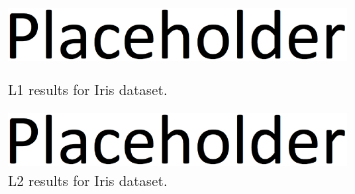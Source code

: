 \documentclass{article}
\begin{document}
\begin{figure}[h!]
  \centering
  \begin{minipage}{0.48\textwidth}
  \centering
  \includegraphics[width=0.8\textwidth]{placeholder.eps}
  \caption{L1 results for Iris dataset.}
  \label{fig:l1-iris}
  \end{minipage}
  \hfill
  \begin{minipage}{0.48\textwidth}
  \centering
    \includegraphics[width=0.8\textwidth]{placeholder.eps}
  \caption{L2 results for Iris dataset.}
  \label{fig:l2-iris}
  \end{minipage}
  \hfill
\end{figure}
\end{document}
